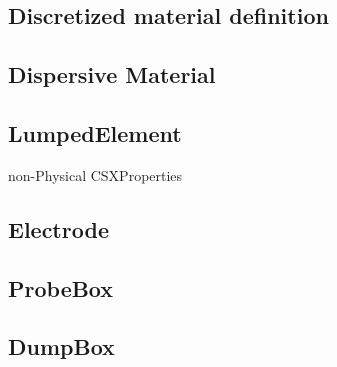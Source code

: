 \subsection{Discretized material definition}\label{subsection_disc_material}
 

\subsection{Dispersive Material}\label{subsection_dispersive_material}
 

\subsection{LumpedElement}\label{subsection_lumpedelement}

 
non-Physical CSXProperties
\subsection{Electrode}\label{subsection_Electrode}  

\subsection{ProbeBox}\label{subsection_ProbeBox}  

\subsection{DumpBox}\label{subsection_DumpBox}
